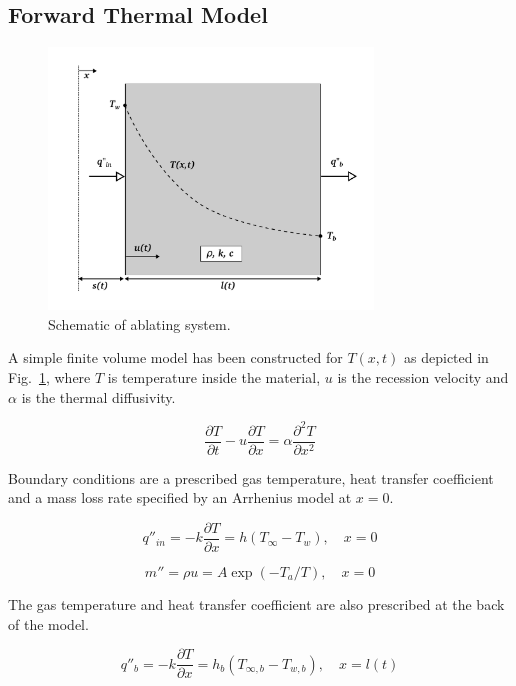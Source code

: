 \documentclass[11pt]{article}
\begin{document}
\subsection{Forward Thermal Model}

\begin{figure}[h]
\begin{center}
\includegraphics[width=3.4in]{new_abl_sys}
\end{center}
\caption{Schematic of ablating system.}
\label{ablating_system} 
\end{figure}

A simple finite volume model has been constructed for $T(x,t)$ as depicted in Fig.~\ref{ablating_system}, where $T$ is temperature inside the material, $u$ is the recession velocity and $\alpha$ is the thermal diffusivity.

\begin{equation}
\frac{\partial T}{\partial t} - u\frac{\partial T}{\partial x} = \alpha\frac{\partial^2 T}{\partial x^2}
\label{eq_fvmodel}
\end{equation}

Boundary conditions are a prescribed gas temperature, heat transfer coefficient and a mass loss rate specified by an Arrhenius model at $x = 0$. 

\begin{equation}
q''_{in} = -k\frac{\partial T}{\partial x} = h(T_\infty - T_w),\quad x = 0 
\label{eq_bcfront}
\end{equation}

\begin{equation}
m'' = \rho u = A\exp(-T_a/T),\quad x = 0
\label{eq_bcarr}
\end{equation}

The gas temperature and heat transfer coefficient are also prescribed at the back of the model.

\begin{equation}
q''_b = -k\frac{\partial T}{\partial x} = h_b(T_{\infty,b} - T_{w,b}),\quad x = l(t)
\label{eq_bcback}
\end{equation}
\end{document}
